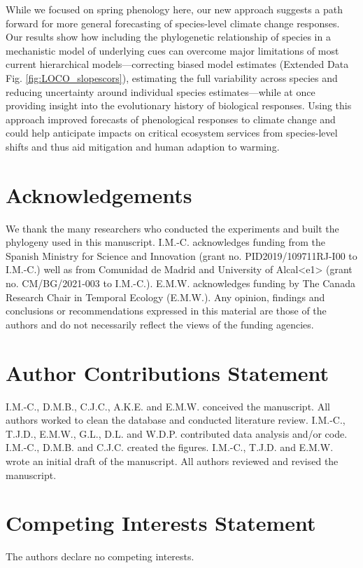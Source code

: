 \documentclass[11pt]{article}
\begin{document}
\par While we focused on spring phenology here, our new approach suggests a path forward for more general forecasting of species-level climate change responses. Our results show how including the phylogenetic relationship of species in a mechanistic model of underlying cues can overcome major limitations of most current hierarchical models---correcting biased model estimates (Extended Data Fig. \ref{fig:LOCO_slopescors}), estimating the full variability across species and reducing uncertainty around individual species estimates---while at once providing insight into the evolutionary history of biological responses. Using this approach improved forecasts of phenological responses to climate change and could help anticipate impacts on critical ecosystem services from species-level shifts and thus aid mitigation and human adaption to warming.


\section*{Acknowledgements}
We thank the many researchers who conducted the experiments and built the phylogeny used in this manuscript. I.M.-C. acknowledges funding from the Spanish Ministry for Science and Innovation (grant no. PID2019/109711RJ-I00 to I.M.-C.) well as from Comunidad de Madrid and University of Alcal<e1> (grant no. CM/BG/2021-003 to I.M.-C.). E.M.W. acknowledges funding by The Canada Research Chair in Temporal Ecology (E.M.W.). Any opinion, findings and conclusions or recommendations expressed in this material are those of the authors and do not necessarily reflect the views of the funding agencies.

\section*{Author Contributions Statement}
I.M.-C., D.M.B., C.J.C., A.K.E. and E.M.W. conceived the manuscript. All authors worked to clean the database and conducted literature review. I.M.-C., T.J.D., E.M.W., G.L., D.L. and W.D.P. contributed data analysis and/or code. I.M.-C., D.M.B. and C.J.C. created the figures. I.M.-C., T.J.D. and E.M.W. wrote an initial draft of the manuscript. All authors reviewed and revised
the manuscript.

\section*{Competing Interests Statement}
The authors declare no competing interests.
\clearpage
\end{document}
